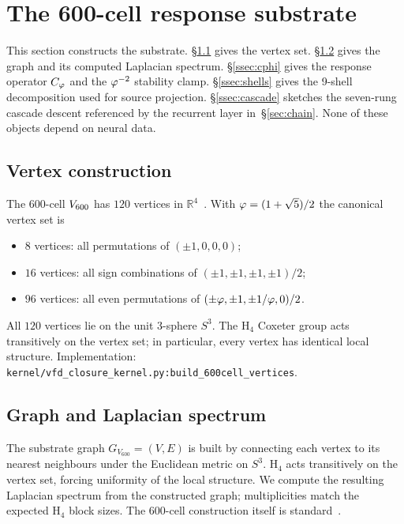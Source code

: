 \section{The 600-cell response substrate}\label{sec:substrate}

This section constructs the substrate. \S\ref{ssec:vertices}
gives the vertex set. \S\ref{ssec:graph} gives the graph and its
computed Laplacian spectrum. \S\ref{ssec:cphi} gives the response
operator $C_{\varphi}$ and the $\varphi^{-2}$ stability clamp.
\S\ref{ssec:shells} gives the 9-shell decomposition used for source
projection. \S\ref{ssec:cascade} sketches the seven-rung cascade
descent referenced by the recurrent layer in~\S\ref{sec:chain}. None
of these objects depend on neural data.

\subsection{Vertex construction}\label{ssec:vertices}

The 600-cell $V_{600}$ has $120$ vertices in
$\mathbb{R}^{4}$~\citep{CoxeterRegularPolytopes,Weisstein600Cell}.
With $\varphi = (1+\sqrt 5)/2$ the canonical vertex set is
\begin{itemize}\itemsep=1pt
\item $8$ vertices: all permutations of $(\pm 1, 0, 0, 0)$;
\item $16$ vertices: all sign combinations of
  $(\pm 1, \pm 1, \pm 1, \pm 1)/2$;
\item $96$ vertices: all even permutations of
  $(\pm \varphi, \pm 1, \pm 1/\varphi, 0)/2$.
\end{itemize}
All $120$ vertices lie on the unit $3$-sphere $S^{3}$. The H$_4$
Coxeter group acts transitively on the vertex set; in particular,
every vertex has identical local structure. Implementation:
\texttt{kernel/vfd\_closure\_kernel.py:build\_600cell\_vertices}.

\subsection{Graph and Laplacian spectrum}\label{ssec:graph}

The substrate graph $G_{V_{600}} = (V, E)$ is built by connecting each
vertex to its nearest neighbours under the Euclidean metric on $S^{3}$.
H$_4$ acts transitively on the vertex set, forcing uniformity of the
local structure. We compute the resulting Laplacian spectrum from the
constructed graph; multiplicities match the expected H$_4$ block
sizes. The 600-cell construction itself is
standard~\citep{CoxeterRegularPolytopes,Weisstein600Cell}.
